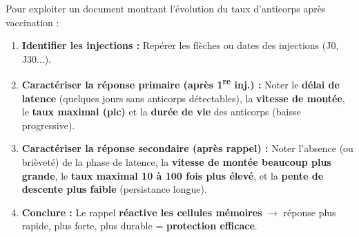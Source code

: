 \documentclass[11pt]{article}
\begin{document}
\begin{methode}
Pour exploiter un document montrant l'évolution du taux d'anticorps après vaccination :
\begin{enumerate}
    \item \textbf{Identifier les injections :} Repérer les flèches ou dates des injections (J0, J30...).
    \item \textbf{Caractériser la réponse primaire (après 1\textsuperscript{re} inj.) :} Noter le \textbf{délai de latence} (quelques jours sans anticorps détectables), la \textbf{vitesse de montée}, le \textbf{taux maximal (pic)} et la \textbf{durée de vie} des anticorps (baisse progressive).
    \item \textbf{Caractériser la réponse secondaire (après rappel) :} Noter l'absence (ou brièveté) de la phase de latence, la \textbf{vitesse de montée beaucoup plus grande}, le \textbf{taux maximal 10 à 100 fois plus élevé}, et la \textbf{pente de descente plus faible} (persistance longue).
    \item \textbf{Conclure :} Le rappel \textbf{réactive les cellules mémoires} $\rightarrow$ réponse plus rapide, plus forte, plus durable = \textbf{protection efficace}.
\end{enumerate}
\end{methode}
\end{document}
